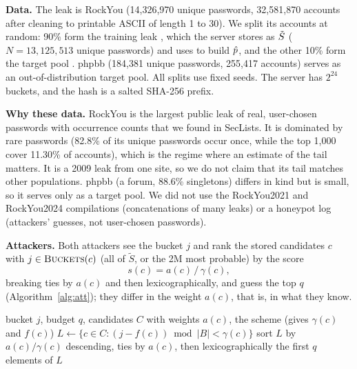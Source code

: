 \textbf{Data.} The leak is RockYou (14,326,970 unique passwords, 32,581,870 accounts after cleaning to printable ASCII of length 1 to 30). We split its accounts at random: 90\% form the training leak \Atrain, which the server stores as $\tilde S$ ($N=13{,}125{,}513$ unique passwords) and uses to build $\hat p$, and the other 10\% form the target pool \Atest. phpbb (184,381 unique passwords, 255,417 accounts) serves as an out-of-distribution target pool. All splits use fixed seeds. The server has $2^{24}$ buckets, and the hash is a salted SHA-256 prefix.

\textbf{Why these data.} RockYou is the largest public leak of real, user-chosen passwords with occurrence counts that we found in SecLists. It is dominated by rare passwords (82.8\% of its unique passwords occur once, while the top 1,000 cover 11.30\% of accounts), which is the regime where an estimate of the tail matters. It is a 2009 leak from one site, so we do not claim that its tail matches other populations. phpbb (a forum, 88.6\% singletons) differs in kind but is small, so it serves only as a target pool. We did not use the RockYou2021 and RockYou2024 compilations (concatenations of many leaks) or a honeypot log (attackers' guesses, not user-chosen passwords).

\textbf{Attackers.} Both attackers see the bucket $j$ and rank the stored candidates $c$ with $j\in\textsc{Buckets}(c)$ (all of $\tilde S$, or the 2M most probable) by the score
\begin{equation}\label{eq:score}
s(c)=a(c)\,/\,\gamma(c),
\end{equation}
breaking ties by $a(c)$ and then lexicographically, and guess the top $q$ (Algorithm~\ref{alg:att}); they differ in the weight $a(c)$, that is, in what they know.

\begin{algorithm}[t]
\caption{Attacker's guess list for bucket $j$ and budget $q$.}
\label{alg:att}
\begin{algorithmic}[1]
\Require bucket $j$, budget $q$, candidates $C$ with weights $a(c)$, the scheme (gives $\gamma(c)$ and $f(c)$)
\State $L\gets\{c\in C : (j-f(c)) \bmod |B| < \gamma(c)\}$ 
\State sort $L$ by $a(c)/\gamma(c)$ descending, ties by $a(c)$, then lexicographically
\State \Return the first $q$ elements of $L$
\end{algorithmic}
\end{algorithm}

